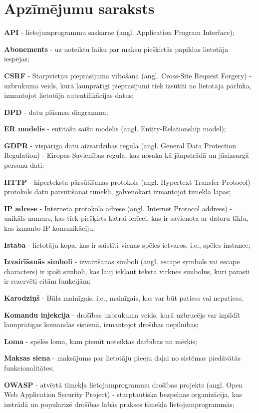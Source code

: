\section*{Apzīmējumu saraksts}
\setlength{\parindent}{0pt}
\textbf{API} - lietojumprogrammu saskarne (angl. Application Program Interface);

\textbf{Abonements} - uz noteiktu laiku par maksu piešķirtās papildus lietotāja iespējas;

\textbf{CSRF} - Starpvietņu pieprasījuma viltošana (angl. Cross-Site Request Forgery) - uzbrukuma veids, kurā ļaunprātīgi pieprasījumi tiek izsūtīti no lietotāja pārlūka, izmantojot lietotāja autentifikācijas datus;

\textbf{DPD} - datu plūsmas diagramma;

\textbf{ER modelis} - entitāšu saišu modelis (angl. Entity-Relationship model);

\textbf{GDPR} - vispārīgā datu aizsardzības regula (angl. General Data Protection Regulation) - Eiropas Savienības regula, kas nosaka kā jāapstrādā un jāaizsargā personu dati;

\textbf{HTTP} - hiperteksta pārsūtīšanas protokols (angl. Hypertext Transfer Protocol) - protokols datu pārsūtīšanai tīmeklī, galvenokārt izmantojot tīmekļa lapas;

\textbf{IP adrese} - Interneta protokola adrese (angl. Internet Protocol address) - unikāls numurs, kas tiek piešķirts katrai ierīcei, kas ir savienota ar datoru tīklu, kas izmanto IP komunikāciju;

\textbf{Istaba} - lietotāju kopa, kas ir saistīti vienas spēles ietvaros, i.e., spēles instance;

\textbf{Izvairīšanās simboli} - izvairīšanās simboli (angl. escape symbols vai escape characters) ir īpaši simboli, kas ļauj iekļaut teksta virknēs simbolus, kuri parasti ir rezervēti citām funkcijām;

\textbf{Karodziņš} - Būla mainīgais, i.e., mainīgais, kas var būt patiess vai nepatiess;

\textbf{Komandu injekcija} - drošības uzbrukuma veids, kurā uzbrucējs var izpildīt ļaunprātīgas komandas sistēmā, izmantojot drošības nepilnības;

\textbf{Loma} - spēlēs loma, kam piemīt noteiktas darbības un mērķis;

\textbf{Maksas siena} - maksājums par lietotāju pieeju daļai no sistēmas piedāvātās funkcionalitātes;

\textbf{OWASP} - atvērtā tīmekļa lietojumprogrammu drošības projekts (angl. Open Web Application Security Project) - starptautiska bezpeļņas organizācija, kas izstrādā un popularizē drošības labās prakses tīmekļa lietojumprogrammās;

